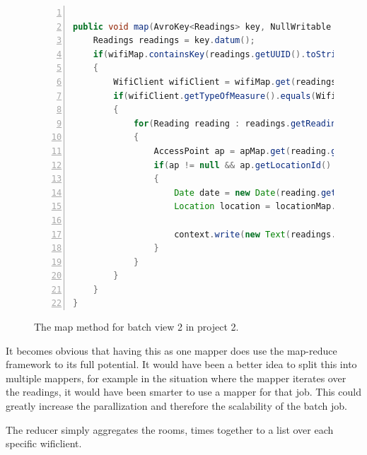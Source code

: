 \begin{figure}[H]
	
\begin{lstlisting}[frame=single, backgroundcolor=\color{light-gray}, basicstyle=\footnotesize\ttfamily, language=Java, numbers=left, numberstyle=\tiny \color{black}, breaklines=true]
 
public void map(AvroKey<Readings> key, NullWritable value, Context context) throws IOException, InterruptedException {
    Readings readings = key.datum();
    if(wifiMap.containsKey(readings.getUUID().toString()))
	{
        WifiClient wifiClient = wifiMap.get(readings.getUUID().toString());
		if(wifiClient.getTypeOfMeasure().equals(WifiClientMeasure.AccessPoint))
		{
		    for(Reading reading : readings.getReadings())
			{
				AccessPoint ap = apMap.get(reading.getValue());
				if(ap != null && ap.getLocationId() != null && locationMap.containsKey(ap.getLocationId()))
				{
					Date date = new Date(reading.getTimeStamp());
					Location location = locationMap.get(ap.getLocationId());
					 
					context.write(new Text(readings.getUUID().toString()), new Text(location.getRoom() + "-" + dateFormat.format(date)));
				}
			}
		}
	}
}
\end{lstlisting}
\label{code:project2_mapper}
\caption{The map method for batch view 2 in project 2.}
\end{figure}

It becomes obvious that having this as one mapper does use the map-reduce framework to its full potential. It would have been a better idea to split this into multiple mappers, for example in the situation where the mapper iterates over the readings, it would have been smarter to use a mapper for that job. This could greatly increase the parallization and therefore the scalability of the batch job.

The reducer simply aggregates the rooms, times together to a list over each specific wificlient.

